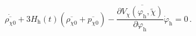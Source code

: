 \begin{equation}                                     \label{dorrhob}
 \dot{\overline{\rho_{\chi 0}}}+3H_{\text{h}}(t)
(\overline{\rho_{\chi 0}}+\overline{p_{\chi 0}})
 -\frac{\partial\overline{V_{\chi}(\varphi_{\text{h}},\tilde{\chi})}}
 {\partial \varphi_{\text{h}}}\dot{\varphi}_{\text{h}}=0\,.
\end{equation}

